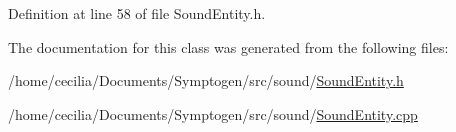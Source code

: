 Definition at line 58 of file Sound\-Entity.\-h.



The documentation for this class was generated from the following files\-:\begin{DoxyCompactItemize}
\item 
/home/cecilia/\-Documents/\-Symptogen/src/sound/\hyperlink{_sound_entity_8h}{Sound\-Entity.\-h}\item 
/home/cecilia/\-Documents/\-Symptogen/src/sound/\hyperlink{_sound_entity_8cpp}{Sound\-Entity.\-cpp}\end{DoxyCompactItemize}
